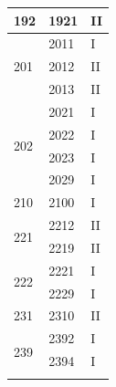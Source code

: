 \documentclass[12pt,a4paper]{article}
\begin{document}
{\begin{longtable}{@{}lll@{}}
		192                                           & 1921                                         & II                                \\ \midrule
		\multirow{3}{*}{201}                          & 2011                                         & I                                 \\ \cmidrule(l){2-3} 
		& 2012                                         & II                                \\ \cmidrule(l){2-3} 
		& 2013                                         & II                                \\ \midrule
		\multirow{4}{*}{202}                          & 2021                                         & I                                 \\ \cmidrule(l){2-3} 
		& 2022                                         & I                                 \\ \cmidrule(l){2-3} 
		& 2023                                         & I                                 \\ \cmidrule(l){2-3} 
		& 2029                                         & I                                 \\ \midrule
		210                                           & 2100                                         & I                                 \\ \midrule
		\multirow{2}{*}{221}                          & 2212                                         & II                                \\ \cmidrule(l){2-3} 
		& 2219                                         & II                                \\ \midrule
		\multirow{2}{*}{222}                          & 2221                                         & I                                 \\ \cmidrule(l){2-3} 
		& 2229                                         & I                                 \\ \midrule
		231                                           & 2310                                         & II                                \\ \midrule
		\multirow{3}{*}{239}                          & 2392                                         & I                                 \\ \cmidrule(l){2-3} 
		& 2394                                         & I                                 \\ \cmidrule(l){2-3} 

\end{longtable}}
\end{document}

